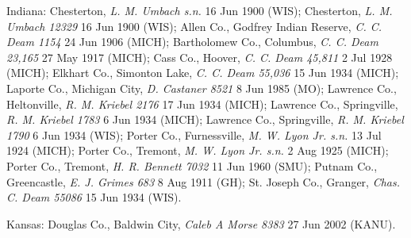 \documentclass{article}
\begin{document}
Indiana:
Chesterton, \textit{L. M. Umbach s.n.} 16 Jun 1900 (WIS);
Chesterton, \textit{L. M. Umbach 12329} 16 Jun 1900 (WIS);
Allen Co., Godfrey Indian Reserve, \textit{C. C. Deam 1154} 24 Jun 1906 (MICH);
Bartholomew Co., Columbus, \textit{C. C. Deam 23,165} 27 May 1917 (MICH);
Cass Co., Hoover, \textit{C. C. Deam 45,811} 2 Jul 1928 (MICH);
Elkhart Co., Simonton Lake, \textit{C. C. Deam 55,036} 15 Jun 1934 (MICH);
Laporte Co., Michigan City, \textit{D. Castaner 8521} 8 Jun 1985 (MO);
Lawrence Co., Heltonville, \textit{R. M. Kriebel 2176} 17 Jun 1934 (MICH);
Lawrence Co., Springville, \textit{R. M. Kriebel 1783} 6 Jun 1934 (MICH);
Lawrence Co., Springville, \textit{R. M. Kriebel 1790} 6 Jun 1934 (WIS);
Porter Co., Furnessville, \textit{M. W. Lyon Jr. s.n.} 13 Jul 1924 (MICH);
Porter Co., Tremont, \textit{M. W. Lyon Jr. s.n.} 2 Aug 1925 (MICH);
Porter Co., Tremont, \textit{H. R. Bennett 7032} 11 Jun 1960 (SMU);
Putnam Co., Greencastle, \textit{E. J. Grimes 683} 8 Aug 1911 (GH);
St. Joseph Co., Granger, \textit{Chas. C. Deam 55086} 15 Jun 1934 (WIS).

Kansas:
Douglas Co., Baldwin City, \textit{Caleb A Morse 8383} 27 Jun 2002 (KANU).
\end{document}

